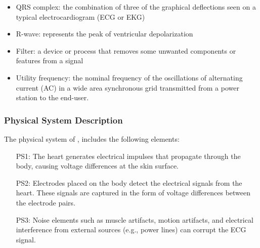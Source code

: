 \documentclass[12pt]{article}
\begin{document}
\begin{itemize}

\item QRS complex: the combination of three of the graphical deflections seen on
a typical electrocardiogram (ECG or EKG)\cite{wiki:QRS_complex}
\item R-wave: represents the peak of ventricular depolarization
\item Filter: a device or process that removes some unwanted components or
features from a signal\cite{wiki:Filter_(signal_processing)}
\item Utility frequency: the nominal frequency of the oscillations of
alternating current (AC) in a wide area synchronous grid transmitted from a
power station to the end-user.\cite{wiki:Utility_frequency}

\end{itemize}

\subsubsection{Physical System Description} \label{sec_phySystDescrip}

The physical system of \progname{}, includes the following elements:

\begin{itemize}

\item[PS1:] The heart generates electrical impulses that propagate through the
body, causing voltage differences at the skin surface.

\item[PS2:] Electrodes placed on the body detect the electrical signals from the
heart.  These signals are captured in the form of voltage differences between
the electrode pairs.

\item[PS3:] Noise elements such as muscle artifacts, motion artifacts, and
electrical interference from external sources (e.g., power lines) can corrupt
the ECG signal.

\end{itemize}

\end{document}
